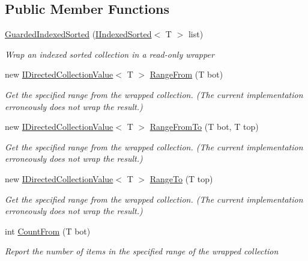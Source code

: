 \subsection*{Public Member Functions}
\begin{DoxyCompactItemize}
\item 
\hyperlink{class_c5_1_1_guarded_indexed_sorted_ae5ded6570af9716bb93a42e5dea55656}{Guarded\+Indexed\+Sorted} (\hyperlink{interface_c5_1_1_i_indexed_sorted}{I\+Indexed\+Sorted}$<$ T $>$ list)
\begin{DoxyCompactList}\small\item\em Wrap an indexed sorted collection in a read-\/only wrapper \end{DoxyCompactList}\item 
new \hyperlink{interface_c5_1_1_i_directed_collection_value}{I\+Directed\+Collection\+Value}$<$ T $>$ \hyperlink{class_c5_1_1_guarded_indexed_sorted_a4234ea1cd38561949156953beb98a19e}{Range\+From} (T bot)
\begin{DoxyCompactList}\small\item\em Get the specified range from the wrapped collection. (The current implementation erroneously does not wrap the result.) \end{DoxyCompactList}\item 
new \hyperlink{interface_c5_1_1_i_directed_collection_value}{I\+Directed\+Collection\+Value}$<$ T $>$ \hyperlink{class_c5_1_1_guarded_indexed_sorted_a039a34453e6451fce027438afed623b0}{Range\+From\+To} (T bot, T top)
\begin{DoxyCompactList}\small\item\em Get the specified range from the wrapped collection. (The current implementation erroneously does not wrap the result.) \end{DoxyCompactList}\item 
new \hyperlink{interface_c5_1_1_i_directed_collection_value}{I\+Directed\+Collection\+Value}$<$ T $>$ \hyperlink{class_c5_1_1_guarded_indexed_sorted_a99cbd7079a015107d98567b63398aa77}{Range\+To} (T top)
\begin{DoxyCompactList}\small\item\em Get the specified range from the wrapped collection. (The current implementation erroneously does not wrap the result.) \end{DoxyCompactList}\item 
int \hyperlink{class_c5_1_1_guarded_indexed_sorted_a8cf3d09d8c435ac0200efc34561e1a86}{Count\+From} (T bot)
\begin{DoxyCompactList}\small\item\em Report the number of items in the specified range of the wrapped collection \end{DoxyCompactList}\item 

\end{DoxyCompactItemize}
